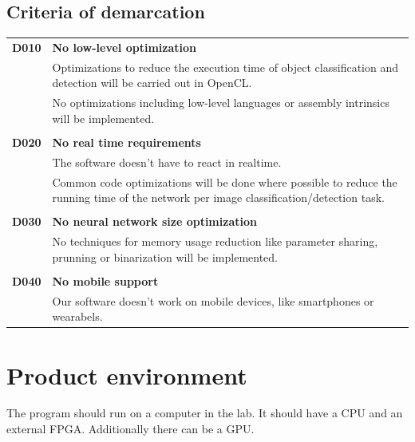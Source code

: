 \documentclass[parskip=full]{scrartcl}
\begin{document}
\subsection{Criteria of demarcation}
\begin{tabular}{p{2cm}p{12cm}}
\textbf{D010} & \textbf{No low-level optimization}\\
& Optimizations to reduce the execution time of object classification and detection will  be carried out in OpenCL.\\
& No optimizations including low-level languages or assembly intrinsics will be implemented.\\
&\\
\textbf{D020} & \textbf{No real time requirements}\\
& The software doesn't have to react in realtime. \\
& Common code optimizations will be done where possible to reduce the running time of the network per image classification/detection task.\\
&\\
\textbf{D030} & \textbf{No neural network size optimization}\\
&No techniques for memory usage reduction like parameter sharing, prunning or binarization will be implemented.\\
&\\
\textbf{D040} & \textbf{No mobile support}\\
& Our software doesn't work on mobile devices, like smartphones or wearabels.
\end{tabular}

\section{Product environment}
The program should run on a computer in the lab. It should have a CPU and an external FPGA. Additionally there can be a GPU.
\end{document}

